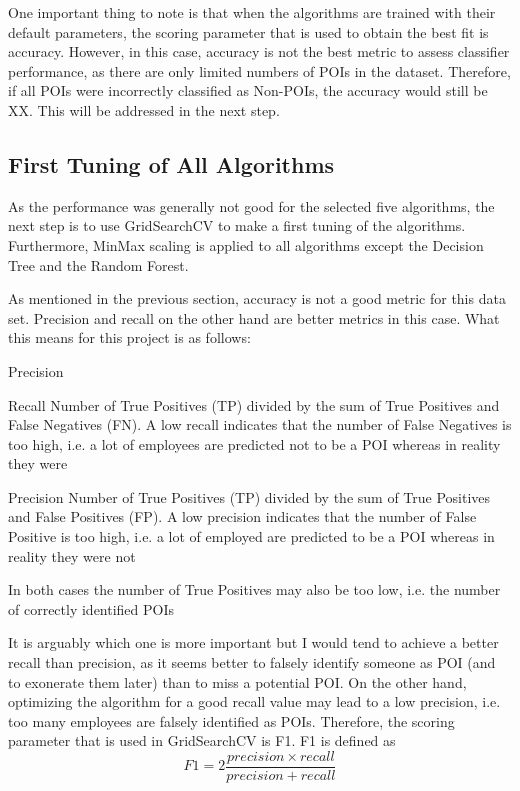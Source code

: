 \documentclass[11pt]{article} %
\begin{document}
One important thing to note is that when the algorithms are trained with their default parameters, the scoring parameter that is used to obtain the best fit is accuracy. However, in this case, accuracy is not the best metric to assess classifier performance, as there are only limited numbers of POIs in the dataset. Therefore, if all POIs were incorrectly classified as Non-POIs, the accuracy would still be XX. This will be addressed in the next step.

\subsection{First Tuning of All Algorithms}
As the performance was generally not good for the selected five algorithms, the next step is to use {\selectfont GridSearchCV} to make a first tuning of the algorithms. Furthermore, MinMax scaling is applied to all algorithms except the Decision Tree and the Random Forest.\medskip

As mentioned in the previous section, accuracy is not a good metric for this data set. Precision and recall on the other hand are better metrics in this case. What this means for this project is as follows:
\begin{labeling}{Precision}
\item [Recall] Number of True Positives (TP) divided by the sum of True Positives and False Negatives (FN). A low recall indicates that the number of False Negatives is too high, i.e. a lot of employees are predicted not to be a POI whereas in reality they were
\item [Precision] Number of True Positives (TP) divided by the sum of True Positives and False Positives (FP). A low precision indicates that the number of False Positive is too high, i.e. a lot of employed are predicted to be a POI whereas in reality they were not
\end{labeling}
In both cases the number of True Positives may also be too low, i.e. the number of correctly identified POIs\medskip

It is arguably which one is more important but I would tend to achieve a better recall than precision, as it seems better to falsely identify someone as POI (and to exonerate them later) than to miss a potential POI. On the other hand, optimizing the algorithm for a good recall value may lead to a low precision, i.e. too many employees are falsely identified as POIs. Therefore, the scoring parameter that is used in {\selectfont GridSearchCV} is F1. F1 is defined as
\begin{equation}
     F1 = 2\frac{precision \times recall}{precision + recall}
  \end{equation}
\end{document}
